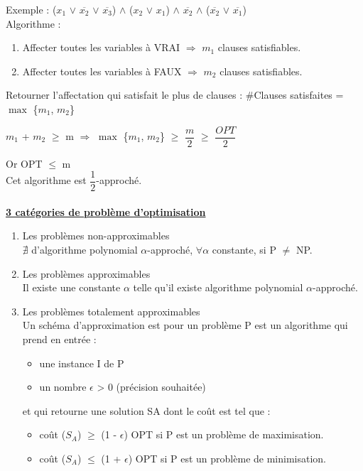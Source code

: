 \documentclass[12pt,a4paper]{article}
\newcommand\tab[1][0.65cm]{\hspace*{#1}}
\begin{document}
\tab Exemple : ($x_1$ $\lor$ $\overline{x_2}$ $\lor$ $\overline{x_3}$) $\land$ ($x_2$ $\lor$ $x_1$) $\land$ $\overline{x_2}$ $\land$ ($\overline{x_2}$ $\lor$ $\overline{x_1}$)\\
\tab Algorithme :
\begin{enumerate}
	\item Affecter toutes les variables à VRAI $\Rightarrow$ $m_1$ clauses satisfiables.
	\item  Affecter toutes les variables à FAUX $\Rightarrow$ $m_2$ clauses satisfiables.
\end{enumerate}
\tab Retourner l'affectation qui satisfait le plus de clauses : \#Clauses satisfaites = $\max$ \{$m_1$, $m_2$\}
\begin{center}
	$m_1$ + $m_2$ $\geq$ m $\Rightarrow$ $\max$ \{$m_1$, $m_2$\} $\geq$ $\dfrac{m}{2}$ $\geq$ $\dfrac{OPT}{2}$
\end{center}
\tab Or OPT $\leq$ m\\
\tab Cet algorithme est $\dfrac{1}{2}$-approché.\\\\
\textbf{\underline{3 catégories de problème d'optimisation}}
\begin{enumerate}
	\item Les problèmes non-approximables\\
	$\nexists$ d'algorithme polynomial $\alpha$-approché, $\forall$$\alpha$ constante, si P $\neq$ NP.
	\item Les problèmes approximables\\
	Il existe une constante $\alpha$ telle qu'il existe algorithme polynomial $\alpha$-approché.
	\item Les problèmes totalement approximables\\
	Un schéma d'approximation est pour un problème P est un algorithme qui prend en entrée :
	\begin{itemize}
		\item une instance I de P
		\item un nombre $\epsilon$ > 0 (précision souhaitée)
	\end{itemize}
	et qui retourne une solution SA dont le coût est tel que :
	\begin{itemize}
		\item coût ($S_A$) $\geq$ (1 - $\epsilon$) OPT si P est un problème de maximisation.
		\item coût ($S_A$) $\leq$ (1 + $\epsilon$) OPT si P est un problème de minimisation.\\
	\end{itemize}
\end{enumerate}
\end{document}
